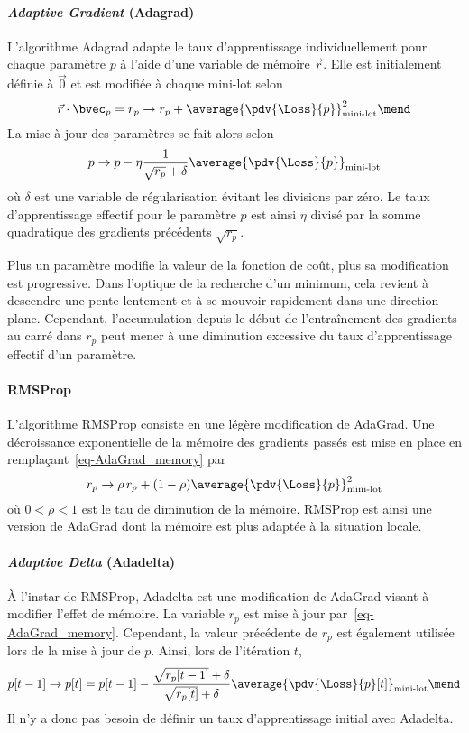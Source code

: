 \paragraph{\emph{Adaptive Gradient} (Adagrad)} \cite{adagrad}
L'algorithme Adagrad adapte le taux d'apprentissage individuellement pour chaque paramètre $p$
à l'aide d'une
variable de mémoire $\vec{r}$.
Elle est initialement définie à $\vec{0}$ et est modifiée à chaque mini-lot selon
\begin{equation}
\vec{r}\cdot\bvec_p = r_p \to r_p + \average{\pdv{\Loss}{p}}_\text{mini-lot}^2
\label{eq-AdaGrad_memory}
\mend
\end{equation}
La mise à jour des paramètres se fait alors selon
\begin{equation}
p \to p - \eta \frac{1}{\sqrt{r_p}+\delta} \average{\pdv{\Loss}{p}}_\text{mini-lot}
\end{equation}
où $\delta$ est une variable de régularisation évitant les divisions par zéro.
Le taux d'apprentissage effectif pour le paramètre $p$
est ainsi $\eta$ divisé par la somme quadratique des gradients précédents $\sqrt{r_p}$.
\par
Plus un paramètre modifie la valeur de la fonction de coût, plus sa modification est progressive.
Dans l'optique de la recherche d'un minimum, cela revient à descendre une pente lentement et à se mouvoir rapidement dans une direction plane.
Cependant, l'accumulation depuis le début de l'entraînement des gradients au carré dans $r_p$ peut mener à une diminution excessive du taux d'apprentissage effectif d'un paramètre.
\paragraph{RMSProp} \cite{RMSProp}
L'algorithme RMSProp consiste en une légère modification de AdaGrad.
Une décroissance exponentielle de la mémoire des gradients passés est mise en place en remplaçant~\eqref{eq-AdaGrad_memory} par
\begin{equation}
r_p \to \rho \, r_p + (1-\rho)\average{\pdv{\Loss}{p}}_\text{mini-lot}^2
\end{equation}
où $0<\rho<1$ est le tau de diminution de la mémoire.
RMSProp est ainsi une version de AdaGrad dont la mémoire est plus adaptée à la situation locale.
\paragraph{\emph{Adaptive Delta} (Adadelta)}
À l'instar de RMSProp, Adadelta est une modification de AdaGrad visant à modifier l'effet de mémoire.
La variable $r_p$ est mise à jour par~\eqref{eq-AdaGrad_memory}.
Cependant, la valeur précédente de $r_p$ est également utilisée lors de la mise à jour de $p$.
Ainsi, lors de l'itération $t$,
\begin{equation}
p [t-1] \to p [t] = p[t-1] - \frac{\sqrt{r_p[t-1]}+\delta}{\sqrt{r_p[t]}+\delta} \average{\pdv{\Loss}{p} [t]}_\text{mini-lot}
\mend
\end{equation}
Il n'y a donc pas besoin de définir un taux d'apprentissage initial avec Adadelta.
